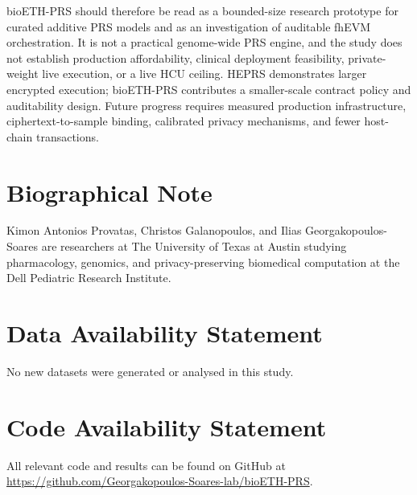 \documentclass[10pt,twocolumn]{article}
\begin{document}
bioETH-PRS should therefore be read as a bounded-size research prototype for curated
additive PRS models and as an investigation of auditable fhEVM orchestration.  It is not
a practical genome-wide PRS engine, and the study does not establish production
affordability, clinical deployment feasibility, private-weight live execution, or a
live HCU ceiling.  HEPRS demonstrates larger encrypted execution; bioETH-PRS contributes
a smaller-scale contract policy and auditability design.  Future progress requires
measured production infrastructure, ciphertext-to-sample binding, calibrated privacy
mechanisms, and fewer host-chain transactions.

\section*{Biographical Note}
Kimon Antonios Provatas, Christos Galanopoulos, and Ilias Georgakopoulos-Soares are researchers at The University of Texas at Austin studying pharmacology, genomics, and privacy-preserving biomedical computation at the Dell Pediatric Research Institute.

\section*{Data Availability Statement}
No new datasets were generated or analysed in this study.

\section*{Code Availability Statement}
All relevant code and results can be found on GitHub at \url{https://github.com/Georgakopoulos-Soares-lab/bioETH-PRS}.



\end{document}

